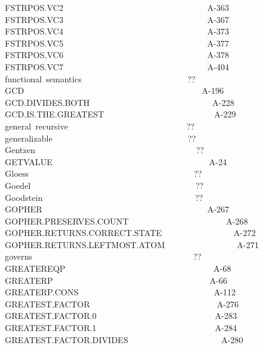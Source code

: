 \documentclass[11pt]{book}
\newenvironment{pubasis}{\begin{flushleft}\ttfamily\small}{\normalsize\rmfamily\end{flushleft}}
\begin{document}
\begin{pubasis}
FSTRPOS.VC2~~~~~~~~~~~~~~~~~~~~~~~~~~~~~~~~~~A-363\\
FSTRPOS.VC3~~~~~~~~~~~~~~~~~~~~~~~~~~~~~~~~~~A-367\\
FSTRPOS.VC4~~~~~~~~~~~~~~~~~~~~~~~~~~~~~~~~~~A-373\\
FSTRPOS.VC5~~~~~~~~~~~~~~~~~~~~~~~~~~~~~~~~~~A-377\\
FSTRPOS.VC6~~~~~~~~~~~~~~~~~~~~~~~~~~~~~~~~~~A-378\\
FSTRPOS.VC7~~~~~~~~~~~~~~~~~~~~~~~~~~~~~~~~~~A-404\\
functional~semantics~~~~~~~~~~~~~~~~~~~~~~~~~??\\
GCD~~~~~~~~~~~~~~~~~~~~~~~~~~~~~~~~~~~~~~~~~~A-196\\
GCD.DIVIDES.BOTH~~~~~~~~~~~~~~~~~~~~~~~~~~~~~A-228\\
GCD.IS.THE.GREAT\-EST~~~~~~~~~~~~~~~~~~~~~~~~~~A-229\\
general~recursive~~~~~~~~~~~~~~~~~~~~~~~~~~~~??\\
generalizable~~~~~~~~~~~~~~~~~~~~~~~~~~~~~~~~??\\
Gentzen~~~~~~~~~~~~~~~~~~~~~~~~~~~~~~~~~~~~~~??\\
GETVALUE~~~~~~~~~~~~~~~~~~~~~~~~~~~~~~~~~~~~~A-24\\
Gloess~~~~~~~~~~~~~~~~~~~~~~~~~~~~~~~~~~~~~~~??\\
Goedel~~~~~~~~~~~~~~~~~~~~~~~~~~~~~~~~~~~~~~~??\\
Goodstein~~~~~~~~~~~~~~~~~~~~~~~~~~~~~~~~~~~~??\\
GOPHER~~~~~~~~~~~~~~~~~~~~~~~~~~~~~~~~~~~~~~~A-267\\
GOPHER.PRESERVES.COUNT~~~~~~~~~~~~~~~~~~~~~~~A-268\\
GOPHER.RETURNS.CORRECT.STATE~~~~~~~~~~~~~~~~~A-272\\
GOPHER.RETURNS.LEFTMOST.ATOM~~~~~~~~~~~~~~~~~A-271\\
governs~~~~~~~~~~~~~~~~~~~~~~~~~~~~~~~~~~~~~~??\\
GREATEREQP~~~~~~~~~~~~~~~~~~~~~~~~~~~~~~~~~~~A-68\\
GREATERP~~~~~~~~~~~~~~~~~~~~~~~~~~~~~~~~~~~~~A-66\\
GREATERP.CONS~~~~~~~~~~~~~~~~~~~~~~~~~~~~~~~~A-112\\
GREAT\-EST.FAC\-TOR~~~~~~~~~~~~~~~~~~~~~~~~~~~~~~A-276\\
GREAT\-EST.FAC\-TOR.0~~~~~~~~~~~~~~~~~~~~~~~~~~~~A-283\\
GREAT\-EST.FAC\-TOR.1~~~~~~~~~~~~~~~~~~~~~~~~~~~~A-284\\
GREAT\-EST.FAC\-TOR.DIVIDES~~~~~~~~~~~~~~~~~~~~~~A-280\\

\end{pubasis}
\end{document}
